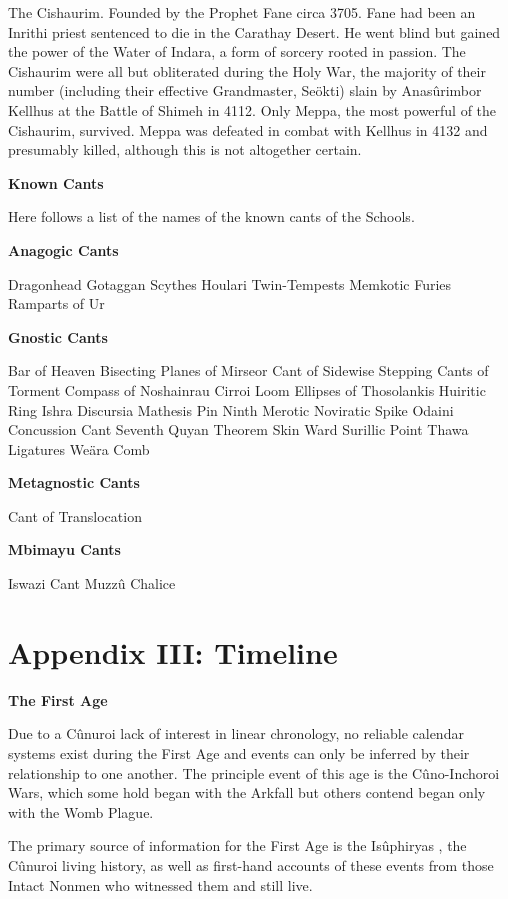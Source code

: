 \documentclass[]{book}
\begin{document}
The Cishaurim. Founded by the Prophet Fane circa 3705. Fane had been an Inrithi
priest sentenced to die in the Carathay Desert. He went blind but gained the power of
the Water of Indara, a form of sorcery rooted in passion. The Cishaurim were all but
obliterated during the Holy War, the majority of their number (including their effective
Grandmaster, Seökti) slain by Anasûrimbor Kellhus at the Battle of Shimeh in 4112.
Only Meppa, the most powerful of the Cishaurim, survived. Meppa was defeated in
combat with Kellhus in 4132 and presumably killed, although this is not altogether
certain.

\textbf{Known Cants}

Here follows a list of the names of the known cants of the Schools.

\textbf{Anagogic Cants}

Dragonhead
Gotaggan Scythes
Houlari Twin-Tempests
Memkotic Furies
Ramparts of Ur

\textbf{Gnostic Cants}

Bar of Heaven
Bisecting Planes of Mirseor
Cant of Sidewise Stepping
Cants of Torment
Compass of Noshainrau
Cirroi Loom
Ellipses of Thosolankis
Huiritic Ring
Ishra Discursia
Mathesis Pin
Ninth Merotic
Noviratic Spike
Odaini Concussion Cant
Seventh Quyan Theorem
Skin Ward
Surillic Point
Thawa Ligatures
Weära Comb

\textbf{Metagnostic Cants}

Cant of Translocation

\textbf{Mbimayu Cants}

Iswazi Cant
Muzzû Chalice

\hypertarget{appendix-iii-timeline}{%
\section{Appendix III: Timeline}\label{appendix-iii-timeline}}

\textbf{The First Age}

Due to a Cûnuroi lack of interest in linear chronology, no reliable calendar systems
exist during the First Age and events can only be inferred by their relationship to one
another. The principle event of this age is the Cûno-Inchoroi Wars, which some hold
began with the Arkfall but others contend began only with the Womb Plague.

The primary source of information for the First Age is the Isûphiryas , the Cûnuroi
living history, as well as first-hand accounts of these events from those Intact Nonmen
who witnessed them and still live.
\end{document}

